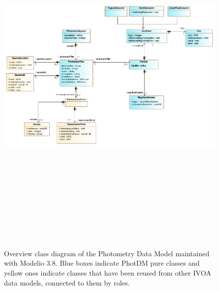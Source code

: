\documentclass[11pt,a4paper]{ivoa}
\begin{document}
\begin{figure}[H]
\includegraphics[angle=90,width=5.98in,height=7.19in]{./schema/PhotometryOverviewDiagram_20220520.png}
\caption{Overview class diagram of the Photometry Data Model maintained with Modelio 3.8.
Blue boxes indicate PhotDM pure classes and yellow ones indicate classes that have been reused from other
IVOA data models, connected to them by roles.}
\label{fig:overview}
\end{figure}
\end{document}
